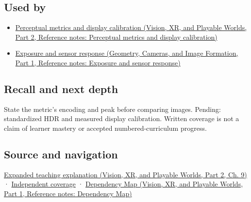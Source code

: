 \subsection{Used by}\label{appendix-a9f83ad40792-used-by}

\hypertarget{appendix-a9f83ad40792-used-by}{}

\begin{itemize}
\tightlist
\item
  \href{../07-Vision-XR-and-Playable-Worlds-P02/main.pdf\#appendix-b2c1846508bf}{Perceptual metrics and display calibration (Vision, XR, and Playable Worlds, Part 2, Reference notes: Perceptual metrics and display calibration)}
\item
  \href{../03-Geometry-Cameras-and-Image-Formation-P01/main.pdf\#appendix-92d45cdf2afc}{Exposure and sensor response (Geometry, Cameras, and Image Formation, Part 1, Reference notes: Exposure and sensor response)}
\end{itemize}

\subsection{Recall and next depth}\label{appendix-a9f83ad40792-recall-and-next-depth}

\hypertarget{appendix-a9f83ad40792-recall-and-next-depth}{}

State the metric's encoding and peak before comparing images. Pending: standardized HDR and measured display calibration. Written coverage is not a claim of learner mastery or accepted numbered-curriculum progress.

\subsection{Source and navigation}\label{appendix-a9f83ad40792-source-and-navigation}

\hypertarget{appendix-a9f83ad40792-source-and-navigation}{}

\href{../07-Vision-XR-and-Playable-Worlds-P02/main.pdf\#04-visual-computing-ii-ch042-encoded-rgb-must-not-masquerade-as-linear-light}{Expanded teaching explanation (Vision, XR, and Playable Worlds, Part 2, Ch. 9)} · \hyperref[appendix-fd090d982a15-xr01---independent-seeing-and-representation-source]{Independent coverage} · \href{../07-Vision-XR-and-Playable-Worlds-P01/main.pdf\#appendix-4ad47bdd269a}{Dependency Map (Vision, XR, and Playable Worlds, Part 1, Reference notes: Dependency Map)}

